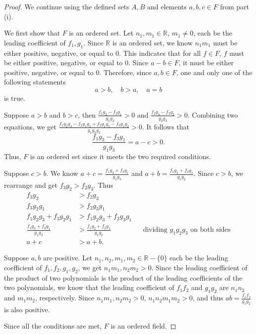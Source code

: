 \documentclass[addpoints, 11pt]{exam}
\newcommand*{\R}{\mathbb{R}}
\begin{document}
\begin{enumerate}[(i)]
    \begin{proof}
         We continue using the defined sets $A, B$ and elements $a, b, c \in F$ from part (i). 

         We first show that $F$ is an ordered set. Let $n_1, m_1 \in \R$, $m_1 \neq 0$, each be the leading coefficient of $f_1, g_1$. Since $\R$ is an ordered set, we know $n_1m_1$ must be either positive, negative, or equal to $0$. This indicates that for all $f \in F$, $f$ must be either positive, negative, or equal to $0$. Since $a - b \in F$, it must be either positive, negative, or equal to $0$. Therefore, since $a, b \in F$, one and only one of the following statements
         \[
            a > b, \quad b > a, \quad a = b
         \]
         is true.

        Suppose $a > b$ and $b > c$, then $\frac{f_1g_2 - f_2g_1}{g_1g_2} > 0$ and $\frac{f_2g_3 - f_3g_2}{g_2g_3} > 0$. Combining two equations, we get $\frac{f_1g_2g_3 - f_2g_1g_3 + f_2g_1g_3 - f_3g_1g_2}{g_1g_2g_3} > 0$. It follows that
        \[
            \frac{f_1g_3 - f_3g_1}{g_1g_3} = a - c > 0.
        \]
        Thus, $F$ is an ordered set since it meets the two required conditions.

        Suppose $c > b$. We know $a + c = \frac{f_1g_3 + f_3g_1}{g_1g_3}$ and $a + b = \frac{f_1g_2 + f_2g_1}{g_1g_2}$. Since $c > b$, we rearrange and get $f_3g_2 > f_2g_3$. Thus
        \begin{align*}
            f_3g_2 &> f_2g_3 \\
            f_3g_2g_1 &> f_2g_3g_1 \\
            f_1g_2g_3 + f_3g_2g_1 &> f_1g_2g_3 + f_2g_3g_1 \\
            \frac{f_1g_3 + f_3g_1}{g_1g_3} &> \frac{f_1g_2 + f_2g_1}{g_1g_2} && \text{dividing }g_1g_2g_3 \text{ on both sides} \\
            a + c &> a + b.
        \end{align*}

        Suppose $a, b$ are positive. Let $n_1, n_2, m_1, m_2 \in \R - \{0\}$ each be the leading coefficient of $f_1, f_2, g_1, g_2$, we get $n_1m_1, n_2m_2 > 0$. Since the leading coefficient of the product of two polynomials is the product of the leading coefficients of the two polynomials, we know that the leading coefficient of $f_1f_2$ and $g_1g_2$ are $n_1n_2$ and $m_1m_2$, respectively. Since $n_1m_1, n_2m_2 > 0$, $n_1n_2m_1m_2 > 0$, and thus $ab = \frac{f_1f_2}{g_1g_2}$ is also positive.

        Since all the conditions are met, $F$ is an ordered field.
    \end{proof}


\end{enumerate}
\end{document}
